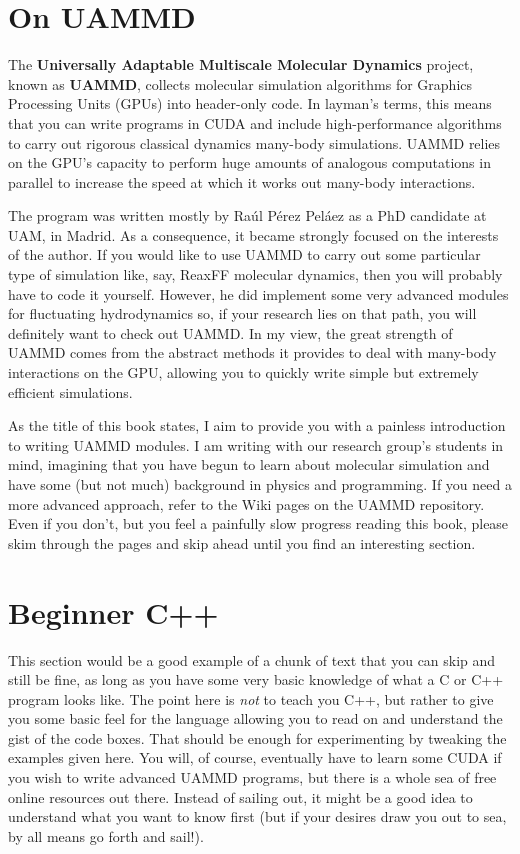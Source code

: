 \section*{On UAMMD}

The \textbf{Universally Adaptable Multiscale Molecular Dynamics} project,
known as \textbf{UAMMD}, collects molecular simulation algorithms for Graphics 
Processing Units (GPUs) into header-only code. In layman's terms, this means 
that you can write programs in CUDA and include high-performance algorithms to 
carry out rigorous classical dynamics many-body simulations. UAMMD relies on the 
GPU's capacity to perform huge amounts of analogous computations in parallel to 
increase the speed at which it works out many-body interactions.

The program was written mostly by Ra\'ul P\'erez Pel\'aez as a PhD candidate at
UAM, in Madrid. As a consequence, it became strongly focused on the interests of
the author. If you would like to use UAMMD to carry out some particular type of
simulation like, say, ReaxFF molecular dynamics, then you will probably have to
code it yourself. However, he did implement some very advanced modules for
fluctuating hydrodynamics so, if your research lies on that path, you will
definitely want to check out UAMMD. In my view, the great strength of UAMMD
comes from the abstract methods it provides to deal with many-body interactions
on the GPU, allowing you to quickly write simple but extremely efficient
simulations.

As the title of this book states, I aim to provide you with a painless 
introduction to writing UAMMD modules. I am writing with our research group's 
students in mind, imagining that you have begun to learn about molecular
simulation and have some (but not much) background in physics and programming.
If you need a more advanced approach, refer to the Wiki pages on the UAMMD
repository. Even if you don't, but you feel a painfully slow progress reading
this book, please skim through the pages and skip ahead until you find an
interesting section.

\section*{Beginner C++}

This section would be a good example of a chunk of text that you can skip and 
still be fine, as long as you have some very basic knowledge of what a C or C++ 
program looks like. The point here is \textit{not} to teach you C++, but rather 
to give you some basic feel for the language allowing you to read on and 
understand the gist of the code boxes. That should be enough for experimenting 
by tweaking the examples given here. You will, of course, eventually have to 
learn some CUDA if you wish to write advanced UAMMD programs, but there is a 
whole sea of free online resources out there. Instead of sailing out, it might 
be a good idea to understand what you want to know first (but if your desires 
draw you out to sea, by all means go forth and sail!).

